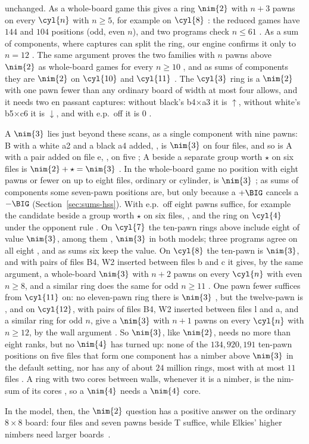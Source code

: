 unchanged. As a whole-board game this gives a ring $\nim{2}$ with $n+3$ pawns on
every $\cyl{n}$ with $n\ge5$, for example  on $\cyl{8}$ : the
reduced games have $144$ and $104$ positions (odd, even $n$), and two programs check $n\le61$ . As a sum of components, where captures can split the ring, our engine confirms it only
to $n=12$ . The same argument proves the two families with $n$ pawns above $\nim{2}$ as whole-board games for every
$n\ge10$ , and as sums of components they are $\nim{2}$ on $\cyl{10}$ and $\cyl{11}$ . The $\cyl{3}$ ring is a $\nim{2}$ with one pawn fewer than any ordinary board of width at most four allows,
and it needs two en passant captures: without black's b4$\times$a3 it is $\uparrow$, without white's
b5$\times$c6 it is $\downarrow$, and with e.p.\ off it is $0$ .

A $\nim{3}$ lies just beyond these scans, as a single component with nine pawns: B with a white a2 and a black a4 added, , is $\nim{3}$ on four
files, and so is A with a pair added on file e, , on five ; A beside a separate group worth
$\star$ on six files is $\nim{2}+\star=\nim{3}$ . In the whole-board game no position with eight pawns or
fewer on up to eight files, ordinary or cylinder, is $\nim{3}$ ; as sums of components some seven-pawn positions are, but only because a $+\BIG$
cancels a $-\BIG$ (Section~\ref{sec:sums-hss}). With e.p.\ off eight pawns suffice, for example the candidate
beside a group worth $\star$ on six files, , and the ring  on $\cyl{4}$ under the opponent rule . On $\cyl{7}$ the ten-pawn rings above include
eight of value $\nim{3}$, among them , $\nim{3}$ in both models;
three programs agree on all eight , and as sums six keep the value. On $\cyl{8}$ the ten-pawn  is $\nim{3}$, and with pairs of files B4, W2
inserted between files b and c it gives, by the same argument, a whole-board $\nim{3}$ with $n+2$ pawns on every
$\cyl{n}$ with even $n\ge8$, and a similar ring does the same for odd $n\ge11$ . One pawn fewer
suffices from $\cyl{11}$ on: no eleven-pawn ring there is $\nim{3}$ , but the twelve-pawn
 is , and  on $\cyl{12}$, with pairs of files B4, W2 inserted between files l and a, and a similar ring for odd $n$,
give a $\nim{3}$ with $n+1$ pawns on every $\cyl{n}$ with $n\ge12$, by the wall argument . So $\nim{3}$, like $\nim{2}$, needs no more than eight ranks, but no $\nim{4}$ has turned up: none of
the $134{,}920{,}191$ ten-pawn positions on five files that form one component has a nimber above $\nim{3}$
in the default setting, nor has any of about $24$ million rings, most with at most $11$ files . A ring with two
cores between walls, whenever it is a nimber, is the nim-sum of its cores , so a $\nim{4}$ needs a
$\nim{4}$ core.

In the model, then, the $\nim{2}$ question has a positive answer on the ordinary $8\times8$ board: four files
and seven pawns beside T suffice, while Elkies' higher nimbers need larger boards~\cite{Elkies2002}.
